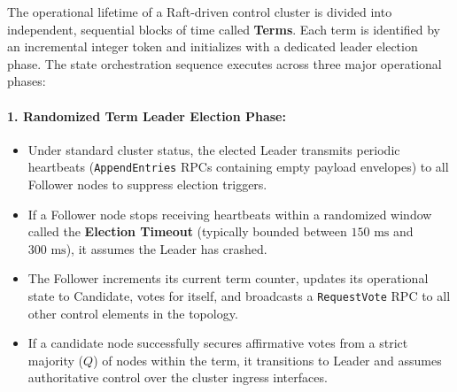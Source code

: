 The operational lifetime of a Raft-driven control cluster is divided into independent, sequential blocks of time called \textbf{Terms}. Each term is identified by an incremental integer token and initializes with a dedicated leader election phase. The state orchestration sequence executes across three major operational phases:

\paragraph{1. Randomized Term Leader Election Phase:}
\begin{itemize}
    \item Under standard cluster status, the elected Leader transmits periodic heartbeats (\texttt{AppendEntries} RPCs containing empty payload envelopes) to all Follower nodes to suppress election triggers.
    \item If a Follower node stops receiving heartbeats within a randomized window called the \textbf{Election Timeout} (typically bounded between $150\text{ ms}$ and $300\text{ ms}$), it assumes the Leader has crashed.
    \item The Follower increments its current term counter, updates its operational state to Candidate, votes for itself, and broadcasts a \texttt{RequestVote} RPC to all other control elements in the topology.
    \item If a candidate node successfully secures affirmative votes from a strict majority ($Q$) of nodes within the term, it transitions to Leader and assumes authoritative control over the cluster ingress interfaces.
\end{itemize}

